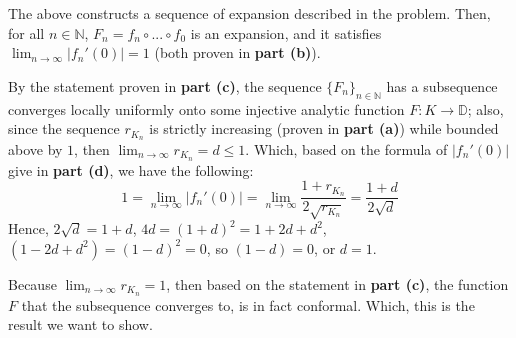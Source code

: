 \documentclass{article}
\begin{document}
\begin{itemize}
    The above constructs a sequence of expansion described in the problem. Then, for all $n\in\mathbb{N}$, $F_n=f_n\circ...\circ f_0$ is an expansion, and it satisfies $\lim_{n\rightarrow\infty}|f_n'(0)|=1$ (both proven in \textbf{part (b)}).

    By the statement proven in \textbf{part (c)}, the sequence $\{F_n\}_{n\in\mathbb{N}}$ has a subsequence converges locally uniformly onto some injective analytic function $F:K\rightarrow\mathbb{D}$; also, since the sequence $r_{K_n}$ is strictly increasing (proven in \textbf{part (a)}) while bounded above by $1$,
    then $\lim_{n\rightarrow\infty}r_{K_n}=d\leq 1$. Which, based on the formula of $|f_n'(0)|$ give in \textbf{part (d)}, we have the following:
    $$1=\lim_{n\rightarrow\infty}|f_n'(0)|=\lim_{n\rightarrow\infty}\frac{1+r_{K_n}}{2\sqrt{r_{K_n}}} = \frac{1+d}{2\sqrt{d}}$$
    Hence, $2\sqrt{d}=1+d$, $4d=(1+d)^2=1+2d+d^2$, $(1-2d+d^2)=(1-d)^2=0$, so $(1-d)=0$, or $d=1$.

    Because $\lim_{n\rightarrow\infty}r_{K_n}=1$, then based on the statement in \textbf{part (c)}, the function $F$ that the subsequence converges to, is in fact conformal.
    Which, this is the result we want to show.
\end{itemize}
\end{document}
